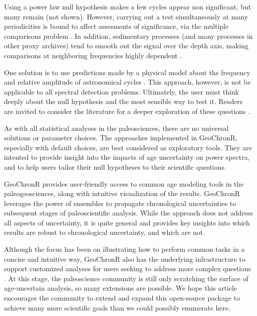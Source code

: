 \documentclass[gchron, manuscript]{copernicus}
\begin{document}
Using a power law null hypothesis makes a few cycles appear non significant, but many remain (not shown).
However, carrying out a test simultaneously at many periodicities is bound to affect assesments of significance, via the multiple comparisons problem \citep{Vaughan_PP2011}. In addition, sedimentary processes (and many processes in other proxy archives) tend to smooth out the signal over the depth axis, making comparisons at neighboring frequencies highly dependent \citep{Meyers_2012}.

One solution is to use predictions made by a physical model about the frequency and relative amplitude of astronomical cycles \citep{MeyersSageman_2007}. This approach, however, is not be applicable to all spectral detection problems. Ultimately, the user must think deeply about the null hypothesis and the most sensible way to test it. Readers are invited to consider the literature for a deeper exploration of these questions \citep[e.g.,][]{Vaughan_PP2011, Meyers_2012, Meyers_2015, MeyersMalinverno2018}.

As with all statistical analyses in the paleosciences, there are no universal solutions or parameter choices.
The approaches implemented in GeoChronR, especially with default choices, are best considered as exploratory tools. They are intented to provide insight into the impacts of age uncertainty on power spectra, and to help users tailor their null hypotheses to their scientific questions.

\conclusions

GeoChronR provides user-friendly access to common age modeling tools in the paleogeosciences, along with intuitive visualization of the results. GeoChronR leverages the power of ensembles to propagate chronological uncertainties to subsequent stages of paleoscientific analysis. While the approach does not address all aspects of uncertainty, it is quite general and provides key insights into which results are robust to chronological uncertainty, and which are not.

Although the focus has been on illustrating how to perform common tasks in a concise and intuitive way, GeoChronR also has the underlying infrastructure to support customized analyses for users seeking to address more complex questions \citep[e.g.][]{thomas2018sikuiui}. At this stage, the paleoscience community is still only scratching the surface of age-uncertain analysis, so many extensions are possible. We hope this article encourages the community to extend and expand this open-source package to achieve many more scientific goals than we could possibly enumerate here.
\end{document}

